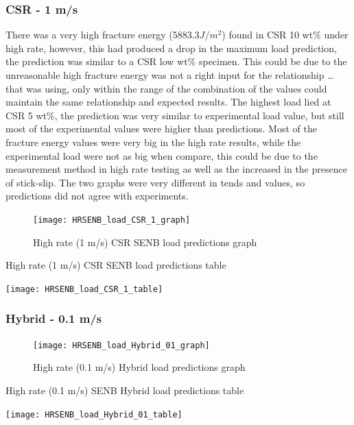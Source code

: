\documentclass[numbers=noendperiod,chapterprefix=on]{icldt} %
\begin{document}
\subsubsection{CSR - 1 m/s}
 There was a very high fracture energy (5883.3$ J/m^{2} $) found in CSR 10 wt\% under high rate, however, this had produced a drop in the maximum load prediction, the prediction was similar to a CSR low wt\% specimen. This could be due to the unreasonable high fracture energy was not a right input for the relationship … that was using, only within the range of the combination of the values could maintain the same relationship and expected results. 
 The highest load lied at CSR 5 wt\%, the prediction was very similar to experimental load value, but still most of the experimental values were higher than predictions. Most of the fracture energy values were very big in the high rate results, while the experimental load were not as big when compare, this could be due to the measurement method in high rate testing as well as the increased in the presence of stick-slip. 
 The two graphs were very different in tends and values, so predictions did not agree with experiments.
 
 \begin{figure}[!hp]
    \centering
    \texttt{[image: HRSENB\_load\_CSR\_1\_graph]}\label{HRSENB_load_CSR_1_graph}
    \caption{High rate (1 m/s) CSR SENB load predictions graph}
    \end{figure}
   \FloatBarrier
   
   \begin{table}
      \centering
      \caption{High rate (1 m/s) CSR SENB load predictions table}\label{HRSENB_load_CSR_1_table}
      \texttt{[image: HRSENB\_load\_CSR\_1\_table]}
      \end{table}
      \FloatBarrier      
 
 \subsubsection{Hybrid - 0.1 m/s}
 
 \begin{figure}[!hp]
    \centering
    \texttt{[image: HRSENB\_load\_Hybrid\_01\_graph]}\label{HRSENB_load_Hybrid_01_graph}
    \caption{High rate (0.1 m/s) Hybrid load predictions graph}
    \end{figure}
   \FloatBarrier
   
   \begin{table}
      \centering
      \caption{High rate (0.1 m/s) SENB Hybrid load predictions table}\label{HRSENB_load_Hybrid_01_table}
      \texttt{[image: HRSENB\_load\_Hybrid\_01\_table]}
      \end{table}
      \FloatBarrier      
          
\end{document}
